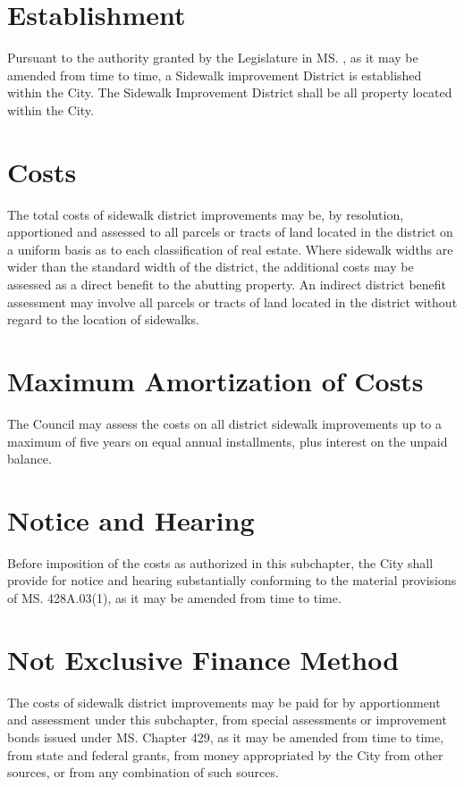 
\setcounter{section}{19}
\section{Establishment}
Pursuant to the authority granted by the Legislature in MS. , as it may be amended from time to time, a Sidewalk improvement District is established within the City. The Sidewalk Improvement District shall be all property located within the City.

\section{Costs}
The total costs of sidewalk district improvements may be, by resolution, apportioned and assessed to all parcels or tracts of land located in the district on a uniform basis as to each classification of real estate. Where sidewalk widths are wider than the standard width of the district, the additional costs may be assessed as a direct benefit to the abutting property. An indirect district benefit assessment may involve all parcels or tracts of land located in the district without regard to the location of sidewalks.

\section{Maximum Amortization of Costs}
The Council may assess the costs on all district sidewalk improvements up to a maximum of five years on equal annual installments, plus interest on the unpaid balance.

\section{Notice and Hearing}
Before imposition of the costs as authorized in this subchapter, the City shall provide for notice and hearing substantially conforming to the material provisions of MS. \textsection 428A.03(1), as it may be amended from time to time.

\section{Not Exclusive Finance Method}
The costs of sidewalk district improvements may be paid for by apportionment and assessment under this subchapter, from special assessments or improvement bonds issued under MS. Chapter 429, as it may be amended from time to time, from state and federal grants, from money appropriated by the City from other sources, or from any combination of such sources.

